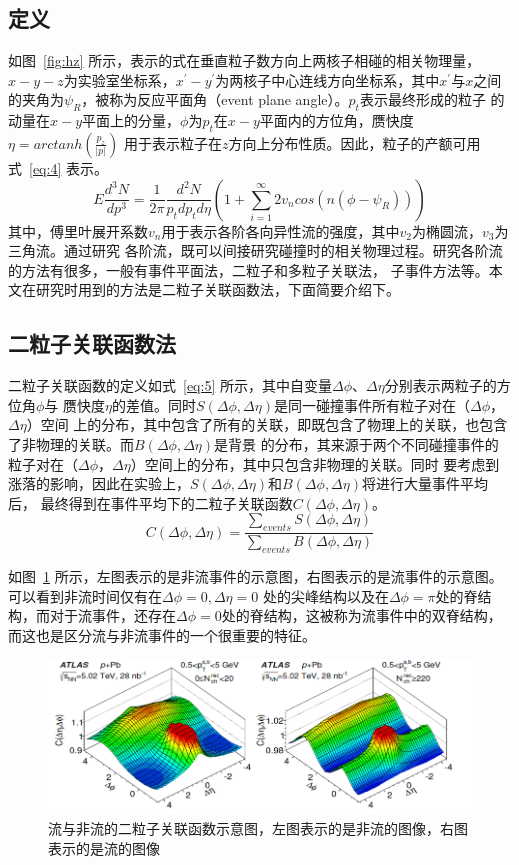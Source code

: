 \documentclass[aps,pre,12pt,preprint,onecolumn,showpacs,showkeys]{revtex4-1}
\begin{document}
\subsection{定义}
如图~\ref{fig:hz} 所示，表示的式在垂直粒子数方向上两核子相碰的相关物理量，
$x-y-z$为实验室坐标系，$x^{'}-y^{'}$为两核子中心连线方向坐标系，其中$x^{'}$与$x$之间
的夹角为$\psi_{R}$，被称为反应平面角（event plane angle）。$p_{t}$表示最终形成的粒子
的动量在$x-y$平面上的分量，$\phi$为$p_{t}$在$x-y$平面内的方位角，赝快度$\eta=arctanh(\frac{p_{z}}{|p|})$
用于表示粒子在$z$方向上分布性质。因此，粒子的产额可用式~\ref{eq:4} 表示\cite{PhysRevC.58.1671}。
\begin{equation}
E\frac{d^{3}N}{dp^{3}}=\frac{1}{2\pi}\frac{d^{2}N}{p_{t}dp_{t}d\eta}(1+\sum_{i=1}^{\infty}2v_{n}cos(n(\phi-\psi_{R}))) \label{eq:4}
\end{equation}
其中，傅里叶展开系数$v_{n}$用于表示各阶各向异性流的强度，其中$v_{2}$为椭圆流，$v_{3}$为三角流。通过研究
各阶流，既可以间接研究碰撞时的相关物理过程。研究各阶流的方法有很多，一般有事件平面法，二粒子和多粒子关联法，
子事件方法等。本文在研究时用到的方法是二粒子关联函数法，下面简要介绍下。
\subsection{二粒子关联函数法}
二粒子关联函数的定义如式~\ref{eq:5} 所示\citet{PhysRevC.96.024908,PhysRevLett.116.172302}，其中自变量$\Delta\phi$、$\Delta\eta$分别表示两粒子的方位角$\phi$与
赝快度$\eta$的差值。同时$S(\Delta\phi,\Delta\eta)$是同一碰撞事件所有粒子对在（$\Delta\phi$，$\Delta\eta$）空间
上的分布，其中包含了所有的关联，即既包含了物理上的关联，也包含了非物理的关联。而$B(\Delta\phi,\Delta\eta)$是背景
的分布，其来源于两个不同碰撞事件的粒子对在（$\Delta\phi$，$\Delta\eta$）空间上的分布，其中只包含非物理的关联。同时
要考虑到涨落的影响，因此在实验上，$S(\Delta\phi,\Delta\eta)$和$B(\Delta\phi,\Delta\eta)$将进行大量事件平均后，
最终得到在事件平均下的二粒子关联函数$C(\Delta\phi,\Delta\eta)$。
\begin{equation}
C(\Delta\phi,\Delta\eta)=\frac{\sum_{events}S(\Delta\phi,\Delta\eta)}{\sum_{events}B(\Delta\phi,\Delta\eta)} \label{eq:5}
\end{equation}
\par
如图~\ref{fig:fnf} 所示\citet{PhysRevC.96.024908}，左图表示的是非流事件的示意图，右图表示的是流事件的示意图。可以看到非流时间仅有在$\Delta\phi=0,\Delta\eta=0$
处的尖峰结构以及在$\Delta\phi=\pi$处的脊结构，而对于流事件，还存在$\Delta\phi=0$处的脊结构，这被称为流事件中的双脊结构，
而这也是区分流与非流事件的一个很重要的特征。
\begin{figure}[t]
\centering
\includegraphics[width=140mm]{fnf}
\caption{\label{fig:fnf}%
流与非流的二粒子关联函数示意图，左图表示的是非流的图像，右图表示的是流的图像}
\end{figure}
\end{document}
